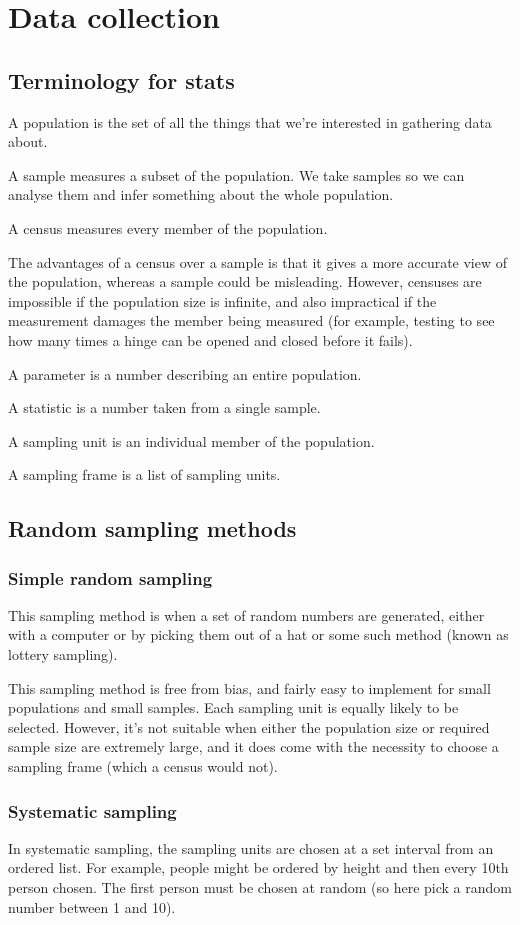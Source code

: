 \section{Data collection}
\subsection{Terminology for stats}
A population is the set of all the things that we're interested in gathering data about.

A sample measures a subset of the population. We take samples so we can analyse them and infer something about the whole population.

A census measures every member of the population.

The advantages of a census over a sample is that it gives a more accurate view of the population, whereas a sample could be misleading. However, censuses are impossible if the population size is infinite, and also impractical if the measurement damages the member being measured (for example, testing to see how many times a hinge can be opened and closed before it fails).

A parameter is a number describing an entire population.

A statistic is a number taken from a single sample.

A sampling unit is an individual member of the population.

A sampling frame is a list of sampling units.

\subsection{Random sampling methods}
\subsubsection{Simple random sampling}
This sampling method is when a set of random numbers are generated, either with a computer or by picking them out of a hat or some such method (known as lottery sampling).

This sampling method is free from bias, and fairly easy to implement for small populations and small samples. Each sampling unit is equally likely to be selected. However, it's not suitable when either the population size or required sample size are extremely large, and it does come with the necessity to choose a sampling frame (which a census would not).

\subsubsection{Systematic sampling}
In systematic sampling, the sampling units are chosen at a set interval from an ordered list. For example, people might be ordered by height and then every 10th person chosen. The first person must be chosen at random (so here pick a random number between 1 and 10).

